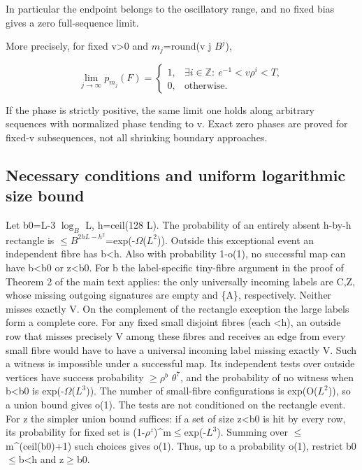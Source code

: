 \documentclass[11pt]{article}
\begin{document}
In particular the endpoint belongs to the oscillatory range, and no fixed bias gives a zero full-sequence limit.

More precisely, for fixed v>0 and $m_{j}$=round(v j $B^{j}$),

\[
\lim_{j\to\infty}p_{m_j}(F)=\begin{cases}1,&\exists i\in\mathbb Z:\ e^{-1}<v\rho^i<T,\\0,&\text{otherwise}.\end{cases}
\]

If the phase is strictly positive, the same limit one holds along arbitrary sequences with normalized phase tending to v. Exact zero phases are proved for fixed-v subsequences, not all shrinking boundary approaches.

\subsection{Necessary conditions and uniform logarithmic size bound}

Let b0=L-3 $\log_B$ L, h=ceil(128 L). The probability of an entirely absent h-by-h rectangle is \ensuremath{\leq}$B^{2hL-h^2}$=exp(-$\Omega$($L^{2}$)). Outside this exceptional event an independent fibre has b<h. Also with probability 1-o(1), no successful map can have b<b0 or z<b0. For b the label-specific tiny-fibre argument in the proof of Theorem 2 of the main text applies: the only universally incoming labels are C,Z, whose missing outgoing signatures are empty and \{A\}, respectively. Neither misses exactly V. On the complement of the rectangle exception the large labels form a complete core. For any fixed small disjoint fibres (each <h), an outside row that misses precisely V among these fibres and receives an edge from every small fibre would have to have a universal incoming label missing exactly V. Such a witness is impossible under a successful map. Its independent tests over outside vertices have success probability \ensuremath{\geq}$\rho^{b}$ $\theta^{7}$, and the probability of no witness when b<b0 is exp(-$\Omega$($L^{3}$)). The number of small-fibre configurations is exp(O($L^{2}$)), so a union bound gives o(1). The tests are not conditioned on the rectangle event. For z the simpler union bound suffices: if a set of size z<b0 is hit by every row, its probability for fixed set is (1-$\rho^{z}$)\textasciicircum{}m\ensuremath{\leq}exp(-$L^{3}$). Summing over \ensuremath{\leq}m\textasciicircum{}(ceil(b0)+1) such choices gives o(1). Thus, up to a probability o(1), restrict b0\ensuremath{\leq}b<h and z\ensuremath{\geq}b0.
\end{document}
